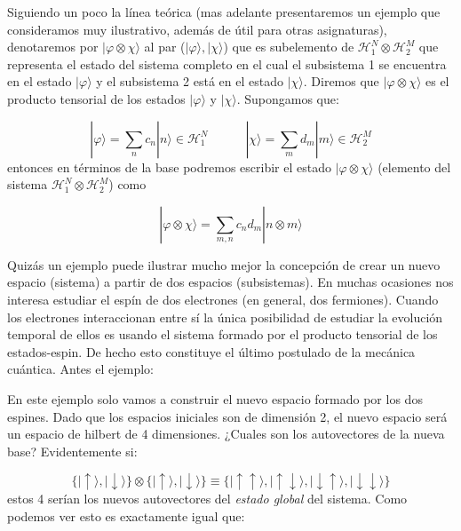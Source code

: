 \documentclass[12pt,a4paper]{book}
\numberwithin{equation}{chapter}
\numberwithin{figure}{chapter}
\newcommand{\tquad}{\quad \quad \quad}
\newcommand{\eup}{\mid \uparrow \rangle}
\newcommand{\edw}{\mid \downarrow \rangle}
\newcommand{\Hcal}{\mathcal{H}}
\begin{document}
Siguiendo un poco la línea teórica (mas adelante presentaremos un ejemplo que consideramos muy ilustrativo, además de útil para otras asignaturas), denotaremos por $|\varphi \otimes \chi \rangle$ al par ($|\varphi\rangle,|\chi\rangle$) que es subelemento de $\Hcal_1^N \otimes \Hcal_2^M$ que representa el estado del sistema completo en el cual el subsistema 1 se encuentra en el estado $|\varphi\rangle$ y el subsistema 2 está en el estado $|\chi\rangle$. Diremos que $|\varphi \otimes \chi \rangle$ es el producto tensorial de los estados $|\varphi \rangle$ y $|\chi \rangle$. Supongamos que: 

\begin{equation}
|\varphi \rangle = \sum_n c_n |n\rangle \in \Hcal_1^N \tquad | \chi \rangle = \sum_m d_m |m \rangle \in \Hcal_2^M
\end{equation}
entonces en términos de la base podremos escribir el estado $|\varphi \otimes \chi \rangle$ (elemento del sistema $\Hcal_1^N \otimes \Hcal_2^M$) como

\begin{equation}
|\varphi \otimes \chi \rangle = \sum_{m,n} c_n d_m |n \otimes m\rangle
\end{equation}

Quizás un ejemplo puede ilustrar mucho mejor la concepción de crear un nuevo espacio (sistema) a partir de dos espacios (subsistemas). En muchas ocasiones nos interesa estudiar el espín de dos electrones (en general, dos fermiones). Cuando los electrones interaccionan entre sí la única posibilidad de estudiar la evolución temporal de ellos es usando el sistema formado por el producto tensorial de los estados-espin. De hecho esto constituye el último postulado de la mecánica cuántica. Antes el ejemplo: \\



\hrulefill

En este ejemplo solo vamos a construir el nuevo espacio formado por los dos espines. Dado que los espacios iniciales son de dimensión 2, el nuevo espacio será un espacio de hilbert de 4 dimensiones. ¿Cuales son los autovectores de la nueva base? Evidentemente si:

$$ \{ \eup, \edw \} \otimes \{ \eup , \edw \}  \equiv \{  \mid \uparrow \uparrow \rangle,  \mid \uparrow \downarrow\rangle,  \mid \downarrow \uparrow \rangle,   \mid\downarrow \downarrow \rangle \}$$
estos 4 serían los nuevos autovectores del \textit{estado global} del sistema. Como podemos ver esto es exactamente igual que:
\end{document}
